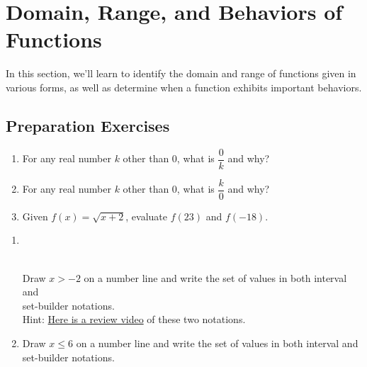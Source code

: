 
\section{Domain, Range, and Behaviors of Functions} \label{functions-domain-range-behavior}

In this section, we'll learn to identify the domain and range of functions given in various forms, as well as determine when a function exhibits important behaviors.\\[0.5em]

\subsection*{Preparation Exercises} \label{prep-functions-domain-range-behavior}

\begin{myPrep}
	\begin{enumerate}
		\item For any real number $k$ other than 0, what is $\dfrac{0}{k}$ and why?
		\vfill
		\item For any real number $k$ other than 0, what is $\dfrac{k}{0}$ and why?
		\vfill
		\item Given $f(x) = \sqrt{x+2}$, evaluate $f(23)$ and $f(-18)$. 
		\vfill
		\vfill
	\end{enumerate}
\end{myPrep}

\begin{myPrep}
	\begin{enumerate}
		\item ~\\ \vspace{-7mm}~\\ \begin{minipage}{0.9\linewidth}
Draw $x > -2$ on a number line and write the set of values in both interval and \\
		 set-builder notations.\\
		Hint: \href{http://tiny.cc/111Z-IntSetNotation}{Here is a review video} of these two notations. 
		\end{minipage}
		\begin{minipage}{0.1\linewidth}
		\flushright {}
		\end{minipage}

		\vfill
		\item Draw $x\leq 6$ on a number line and write the set of values in both interval  and set-builder notations.
		\vfill
	\end{enumerate}
		

\end{myPrep}

